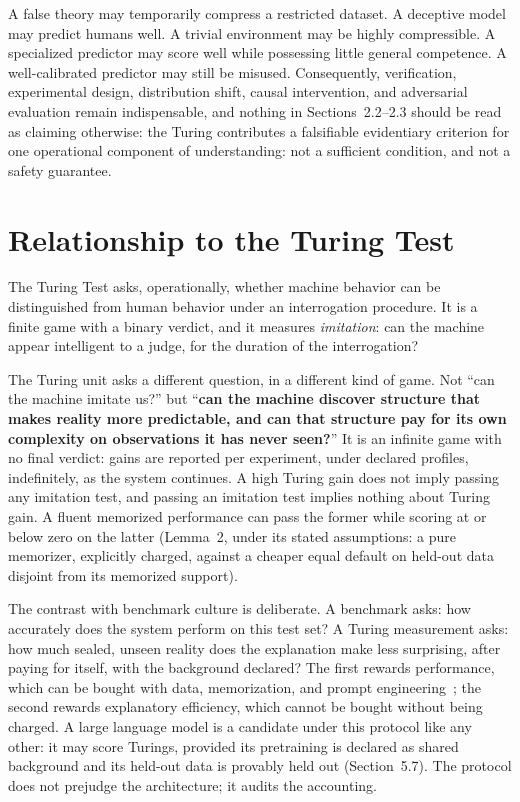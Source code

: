 \documentclass[11pt]{article}
\begin{document}
A false theory may temporarily compress a restricted dataset. A deceptive model may predict humans well. A trivial environment may be highly compressible. A specialized predictor may score well while possessing little general competence. A well-calibrated predictor may still be misused. Consequently, verification, experimental design, distribution shift, causal intervention, and adversarial evaluation remain indispensable, and nothing in Sections~2.2--2.3 should be read as claiming otherwise: the Turing contributes a falsifiable evidentiary criterion for one operational component of understanding: not a sufficient condition, and not a safety guarantee.

\section{Relationship to the Turing Test}

The Turing Test asks, operationally, whether machine behavior can be distinguished from human behavior under an interrogation procedure. It is a finite game with a binary verdict, and it measures \textit{imitation}: can the machine appear intelligent to a judge, for the duration of the interrogation?

The Turing unit asks a different question, in a different kind of game. Not ``can the machine imitate us?'' but ``\textbf{can the machine discover structure that makes reality more predictable, and can that structure pay for its own complexity on observations it has never seen?}'' It is an infinite game with no final verdict: gains are reported per experiment, under declared profiles, indefinitely, as the system continues. A high Turing gain does not imply passing any imitation test, and passing an imitation test implies nothing about Turing gain. A fluent memorized performance can pass the former while scoring at or below zero on the latter (Lemma~2, under its stated assumptions: a pure memorizer, explicitly charged, against a cheaper equal default on held-out data disjoint from its memorized support).

The contrast with benchmark culture is deliberate. A benchmark asks: how accurately does the system perform on this test set? A Turing measurement asks: how much sealed, unseen reality does the explanation make less surprising, after paying for itself, with the background declared? The first rewards performance, which can be bought with data, memorization, and prompt engineering~\cite{chollet2019,carlini2021}; the second rewards explanatory efficiency, which cannot be bought without being charged. A large language model is a candidate under this protocol like any other: it may score Turings, provided its pretraining is declared as shared background and its held-out data is provably held out (Section~5.7). The protocol does not prejudge the architecture; it audits the accounting.
\end{document}
